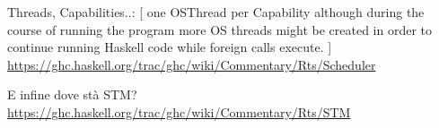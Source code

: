 Threads, Capabilities..:
[ one OSThread per Capability although during the course of running the program more OS threads might be created in order to continue running Haskell code while foreign calls execute. ]
\url{https://ghc.haskell.org/trac/ghc/wiki/Commentary/Rts/Scheduler}

E infine dove stà STM?
\url{https://ghc.haskell.org/trac/ghc/wiki/Commentary/Rts/STM}